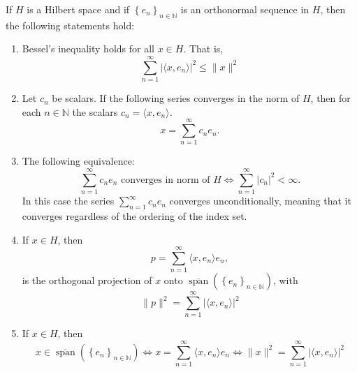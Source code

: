 \documentclass[../thesis.tex]{subfiles}
\begin{document}
\begin{theorem}\label{thrm:orthog_proj_formula_and_facts}
    If $H$ is a Hilbert space and if $\left\{ e_{n} \right\}_{n\in \mathbb{N}}$ is an orthonormal sequence in $H$,  then the following statements hold:
    \begin{enumerate}[label=(\alph*)]
        \item \label{eq:opfaf_a} Bessel's inequality holds for all $x \in H$. That is, 
        \begin{equation}
            \sum_{n=1}^{\infty} \left| \langle x, e_n \rangle \right|^2 \leq \| x\|^2 
        \end{equation}
        
        \item \label{eq:opfaf:b} Let $c_n$ be scalars. If the following series converges in the norm of $H$, then for each $n \in \mathbb{N}$  the scalars $c_n= \langle x, e_n\rangle$. $$ x=\sum_{n=1}^\infty c_n e_n.$$
        
        \item \label{eq:opfaf_c} The following equivalence: 
        \begin{equation}
            \sum_{n=1}^{\infty} c_n e_n \text{ converges in norm of } H \Longleftrightarrow \sum_{n=1}^{\infty} \left| c_n \right|^2 < \infty.
        \end{equation}
        In this case the series $\sum_{n=1}^{\infty} c_n e_n$ converges unconditionally, meaning that it converges regardless of the ordering of the index set.
        
        \item \label{eq:opfaf_d} If $x \in H$, then 
        \begin{equation} 
            p= \sum_{n=1}^{\infty} \langle x, e_n \rangle e_n, 
        \end{equation} 
        is the orthogonal projection of $x$ onto  $\overline{\operatorname{span}} \left( \left\{ e_{n} \right\}_{n\in \mathbb{N}} \right) $, with
        \begin{equation}
            \| p\|^2 = \sum_{n=1}^{\infty} \left| \langle x,e_n \rangle \right|^2
        \end{equation}
        
        \item \label{eq:opfaf_e} If $x \in H$, then 
        \begin{equation}
            x\in \overline{\operatorname{span}} \left( \left\{ e_{n} \right\}_{n\in \mathbb{N}} \right) \Longleftrightarrow x=\sum_{n=1}^{\infty} \langle x, e_n \rangle e_n \Longleftrightarrow \| x\|^2 = \sum_{n=1}^{\infty} \left| \langle x,e_n\rangle \right|^2
        \end{equation}
    \end{enumerate}
\end{theorem}
\end{document}

